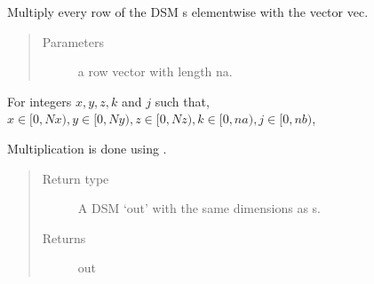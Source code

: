 \documentclass[letterpaper,10pt,english]{sphinxmanual}
\begin{document}
\begin{fulllineitems}
\begin{fulllineitems}
\end{fulllineitems}


\begin{fulllineitems}
\label{\detokenize{index:DictionarySparseMatrix.DS.dict_row_vec_multiply}}
Multiply every row of the DSM s elementwise with the
vector vec.
\begin{quote}\begin{description}
\item[{Parameters}] \leavevmode
{} \textendash{} a row vector with length na.

\end{description}\end{quote}

For integers \(x,y,z,k\) and \(j\) such that,
\(x \in [0,Nx), y \in [0,Ny), z \in [0,Nz), k \in [0,na),j \in [0,nb)\),

\begin{sphinxVerbatim}[commandchars=\\\{\}]
\PYG{p}{[}\PYG{p}{]}\PYG{p}{[}\PYG{p}{]}\PYG{p}{[}\PYG{p}{]}
\end{sphinxVerbatim}

Multiplication is done using     {\hyperref[\detokenize{index:DictionarySparseMatrix.DS}]{}}. 
\begin{quote}\begin{description}
\item[{Return type}] \leavevmode
A DSM ‘out’ with the same dimensions as s.

\item[{Returns}] \leavevmode
out

\end{description}\end{quote}

\end{fulllineitems}


\end{fulllineitems}
\end{document}
